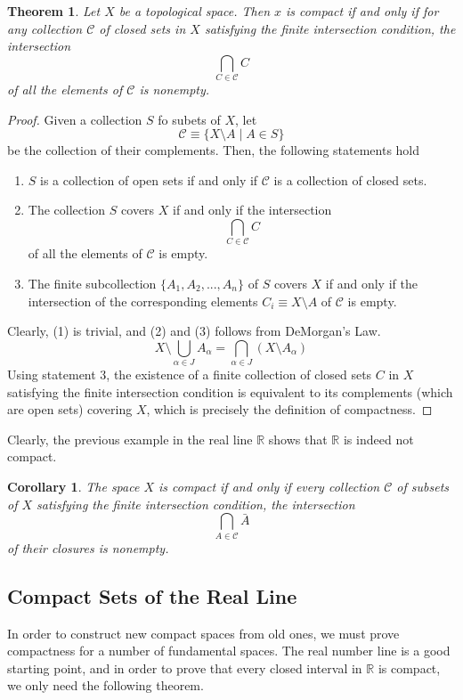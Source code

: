 \documentclass{article}
\newtheorem{theorem}{Theorem}[section]
\newtheorem{corollary}{Corollary}[theorem]
\theoremstyle{remark}
\theoremstyle{definition}
\begin{document}
\begin{theorem}
Let $X$ be a topological space. Then $x$ is compact if and only if for any collection $\mathcal{C}$ of closed sets in $X$ satisfying the finite intersection condition, the intersection 
\[\bigcap_{C \in \mathcal{C}} C\]
of all the elements of $\mathcal{C}$ is nonempty. 
\end{theorem}
\begin{proof}
Given a collection $S$ fo subets of $X$, let 
\[\mathcal{C} \equiv \{X \setminus A \; | \; A \in S\}\]
be the collection of their complements. Then, the following statements hold 
\begin{enumerate}
    \item $S$ is a collection of open sets if and only if $\mathcal{C}$ is a collection of closed sets. 
    \item The collection $S$ covers $X$ if and only if the intersection 
    \[\bigcap_{C \in \mathcal{C}} C\]
    of all the elements of $\mathcal{C}$ is empty. 
    \item The finite subcollection $\{A_1, A_2, ..., A_n\}$ of $S$ covers $X$ if and only if the intersection of the corresponding elements $C_i \equiv X \setminus A$ of $\mathcal{C}$ is empty. 
\end{enumerate}
Clearly, (1) is trivial, and (2) and (3) follows from DeMorgan's Law. 
\[X \setminus \bigcup_{\alpha \in J} A_\alpha = \bigcap_{\alpha \in J} (X \setminus A_\alpha)\]
Using statement 3, the existence of a finite collection of closed sets $C$ in $X$ satisfying the finite intersection condition is equivalent to its complements (which are open sets) covering $X$, which is precisely the definition of compactness. 
\end{proof}

Clearly, the previous example in the real line $\mathbb{R}$ shows that $\mathbb{R}$ is indeed not compact. 

\begin{corollary}
The space $X$ is compact if and only if every collection $\mathscr{C}$ of subsets of $X$ satisfying the finite intersection condition, the intersection 
\[\bigcap_{A \in \mathscr{C}} \bar{A}\]
of their closures is nonempty. 
\end{corollary}

\subsection{Compact Sets of the Real Line}
In order to construct new compact spaces from old ones, we must prove compactness for a number of fundamental spaces. The real number line is a good starting point, and in order to prove that every closed interval in $\mathbb{R}$ is compact, we only need the following theorem. 
\end{document}
